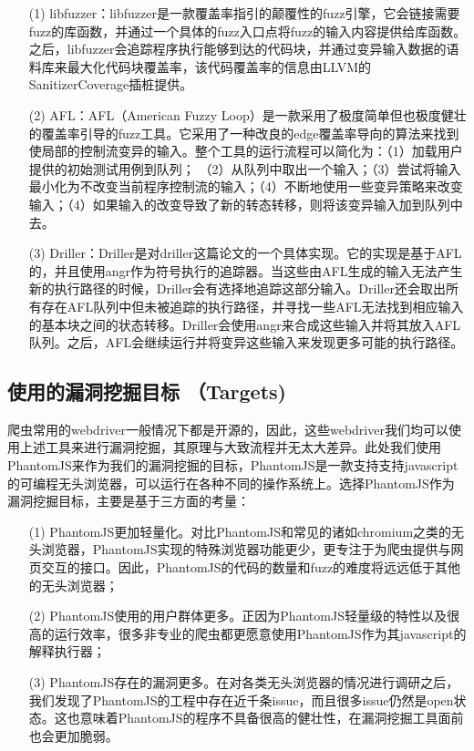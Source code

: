 \documentclass[doctor,privacy,twoside]{buaa_mac}
\begin{document}
\begin{itemize}
\item[(1)] libfuzzer：libfuzzer是一款覆盖率指引的颠覆性的fuzz引擎，它会链接需要fuzz的库函数，并通过一个具体的fuzz入口点将fuzz的输入内容提供给库函数。之后，libfuzzer会追踪程序执行能够到达的代码块，并通过变异输入数据的语料库来最大化代码块覆盖率，该代码覆盖率的信息由LLVM的SanitizerCoverage插桩提供。

\item[(2)] AFL：AFL（American Fuzzy Loop）是一款采用了极度简单但也极度健壮的覆盖率引导的fuzz工具。它采用了一种改良的edge覆盖率导向的算法来找到使局部的控制流变异的输入。整个工具的运行流程可以简化为：（1）加载用户提供的初始测试用例到队列； （2）从队列中取出一个输入；（3）尝试将输入最小化为不改变当前程序控制流的输入；（4）不断地使用一些变异策略来改变输入；（4）如果输入的改变导致了新的转态转移，则将该变异输入加到队列中去。

\item[(3)] Driller：Driller是对driller这篇论文的一个具体实现。它的实现是基于AFL的，并且使用angr作为符号执行的追踪器。当这些由AFL生成的输入无法产生新的执行路径的时候，Driller会有选择地追踪这部分输入。Driller还会取出所有存在AFL队列中但未被追踪的执行路径，并寻找一些AFL无法找到相应输入的基本块之间的状态转移。Driller会使用angr来合成这些输入并将其放入AFL队列。之后，AFL会继续运行并将变异这些输入来发现更多可能的执行路径。

\end{itemize}


\subsection{使用的漏洞挖掘目标 （Targets)}
爬虫常用的webdriver一般情况下都是开源的，因此，这些webdriver我们均可以使用上述工具来进行漏洞挖掘，其原理与大致流程并无太大差异。此处我们使用PhantomJS来作为我们的漏洞挖掘的目标，PhantomJS是一款支持支持javascript的可编程无头浏览器，可以运行在各种不同的操作系统上。选择PhantomJS作为漏洞挖掘目标，主要是基于三方面的考量：

\begin{itemize}
\item[(1)] PhantomJS更加轻量化。对比PhantomJS和常见的诸如chromium之类的无头浏览器，PhantomJS实现的特殊浏览器功能更少，更专注于为爬虫提供与网页交互的接口。因此，PhantomJS的代码的数量和fuzz的难度将远远低于其他的无头浏览器；
\item[(2)]  PhantomJS使用的用户群体更多。正因为PhantomJS轻量级的特性以及很高的运行效率，很多非专业的爬虫都更愿意使用PhantomJS作为其javascript的解释执行器；
\item[(3)]  PhantomJS存在的漏洞更多。在对各类无头浏览器的情况进行调研之后，我们发现了PhantomJS的工程中存在近千条issue，而且很多issue仍然是open状态。这也意味着PhantomJS的程序不具备很高的健壮性，在漏洞挖掘工具面前也会更加脆弱。
\end{itemize}
\end{document}
